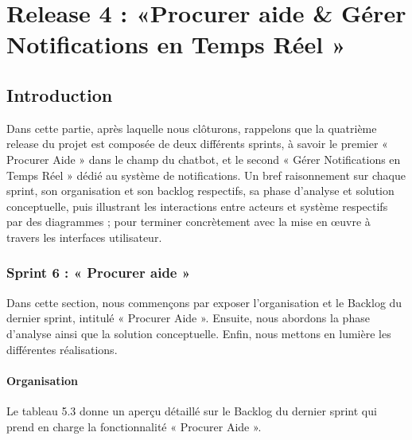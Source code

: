 \chapter{Release 4 : «Procurer aide \& Gérer Notifications en Temps Réel »}




\section{Introduction}
\label{sec_introduction:ch5}
Dans cette partie, après laquelle nous clôturons, rappelons que la quatrième release du projet est composée de deux différents sprints, à savoir le premier « Procurer Aide » dans le champ du chatbot, et le second « Gérer Notifications en Temps Réel » dédié au système de notifications. Un bref raisonnement sur chaque sprint, son organisation et son backlog respectifs, sa phase d'analyse et solution conceptuelle, puis illustrant les interactions entre acteurs et système respectifs par des diagrammes ; pour terminer concrètement avec la mise en œuvre à travers les interfaces utilisateur.

\subsection{Sprint 6 : « Procurer aide »}
\label{sec:sprint6_Procurer aide}
Dans cette section, nous commençons par exposer l’organisation et le Backlog du dernier
sprint, intitulé « Procurer Aide ». Ensuite, nous abordons la phase d’analyse ainsi que la solution
conceptuelle. Enfin, nous mettons en lumière les différentes réalisations.

\subsubsection{Organisation}
Le tableau 5.3 donne un aperçu détaillé sur le Backlog du dernier sprint qui prend en
charge la fonctionnalité « Procurer Aide ».\\

